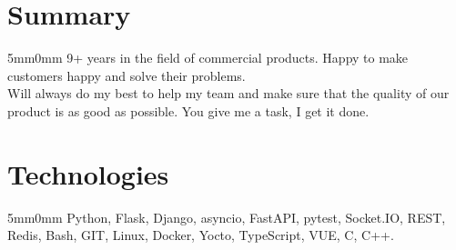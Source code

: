 \documentclass[10pt]{article}
\newcommand{\lmvalue}{5mm}
\newcommand{\rmvalue}{0mm}
\begin{document}

\section*{Summary}
\begin{changemargin}{\lmvalue}{\rmvalue}
	9+ years in the field of commercial products.
	Happy to make customers happy and solve their problems.\\
	Will always do my best to help my team and make sure that the quality of our product is as good as possible.
	You give me a task, I get it done.
\end{changemargin}
\section*{Technologies}
\begin{changemargin}{\lmvalue}{\rmvalue}
	Python, Flask, Django, asyncio, FastAPI, pytest, Socket.IO, REST, Redis, Bash, GIT, Linux,
	Docker, Yocto, TypeScript, VUE, C, C++.
\end{changemargin}
\end{document}
